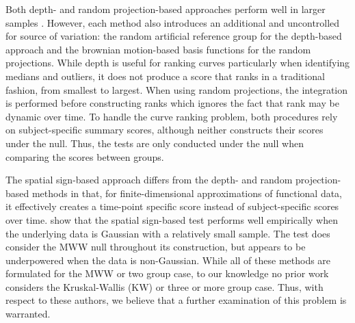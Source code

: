 \documentclass[12pt]{article}
\theoremstyle{plain}
\theoremstyle{remark}
\begin{document}
	Both depth- and random projection-based approaches perform well in larger samples \citep{Lopez2009,Lopez2010,Melendez2021}. However, each method also introduces an additional and uncontrolled for source of variation: the random artificial reference group for the depth-based approach and the brownian motion-based basis functions for the random projections. While depth is useful for ranking curves particularly when identifying medians and outliers, it does not produce a score that ranks in a traditional fashion, from smallest to largest. When using random projections, the integration is performed before constructing ranks which ignores the fact that rank may be dynamic over time. To handle the curve ranking problem, both procedures rely on subject-specific summary scores, although neither constructs their scores under the null. Thus, the tests are only conducted under the null when comparing the scores between groups. 
	
	The spatial sign-based approach differs from the depth- and random projection-based methods in that, for finite-dimensional approximations of functional data, it effectively creates a time-point specific score instead of subject-specific scores over time.
	\cite{Chak2015} show that the spatial sign-based test performs well empirically when the underlying data is Gaussian with a relatively small sample. The test does consider the MWW null throughout its construction, but appears to be underpowered when the data is non-Gaussian. While all of these methods are formulated for the MWW or two group case, to our knowledge no prior work considers the Kruskal-Wallis (KW) or three or more group case. Thus, with respect to these authors, we believe that a further examination of this problem is warranted. 
	
\end{document}
